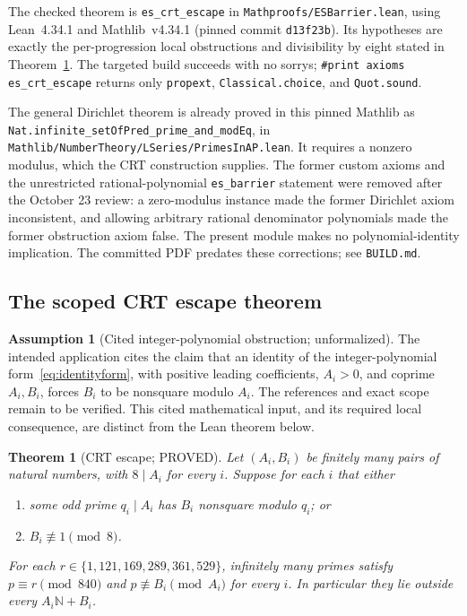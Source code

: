 \documentclass[11pt,a4paper]{article}
\newtheorem{theorem}{Theorem}
\theoremstyle{definition}
\newtheorem{assumption}{Assumption}
\begin{document}
The checked theorem is \texttt{es\_crt\_escape} in
\texttt{Mathproofs/ESBarrier.lean}, using Lean~4.34.1 and
Mathlib~v4.34.1 (pinned commit \texttt{d13f23b}). Its hypotheses are
exactly the per-progression local obstructions and divisibility by eight
stated in Theorem~\ref{thm:barrier}. The targeted build succeeds with
no sorrys; \texttt{\#print axioms es\_crt\_escape} returns only
\texttt{propext}, \texttt{Classical.choice}, and \texttt{Quot.sound}.

The general Dirichlet theorem is already proved in this pinned Mathlib
as \texttt{Nat.infinite\_setOfPred\_prime\_and\_modEq}, in
\texttt{Mathlib/NumberTheory/LSeries/PrimesInAP.lean}. It requires a
nonzero modulus, which the CRT construction supplies. The former custom
axioms and the unrestricted rational-polynomial \texttt{es\_barrier}
statement were removed after the October 23 review: a zero-modulus
instance made the former Dirichlet axiom inconsistent, and allowing
arbitrary rational denominator polynomials made the former obstruction
axiom false. The present module makes no polynomial-identity implication.
The committed PDF predates these corrections; see \texttt{BUILD.md}.

\subsection{The scoped CRT escape theorem}

\begin{assumption}[Cited integer-polynomial obstruction; unformalized]
  \label{lem:schinzel}
  The intended application cites the claim that an identity of the
  integer-polynomial form~\eqref{eq:identityform}, with positive leading
  coefficients, $A_i>0$, and coprime $A_i,B_i$, forces $B_i$ to be nonsquare
  modulo $A_i$. The references and exact scope remain to be verified.
  This cited mathematical input, and its required local consequence,
  are distinct from the Lean theorem below.
\end{assumption}

\begin{theorem}[CRT escape; PROVED]
  \label{thm:barrier}
  Let $(A_i,B_i)$ be finitely many pairs of natural numbers, with
  $8\mid A_i$ for every $i$. Suppose for each $i$ that either
  \begin{enumerate}
    \item some odd prime $q_i\mid A_i$ has $B_i$ nonsquare modulo $q_i$; or
    \item $B_i\not\equiv1\pmod8$.
  \end{enumerate}
  For each $r\in\{1,121,169,289,361,529\}$, infinitely many primes
  satisfy $p\equiv r\pmod{840}$ and $p\not\equiv B_i\pmod{A_i}$ for
  every $i$. In particular they lie outside every $A_i\mathbb{N}+B_i$.
\end{theorem}
\end{document}

